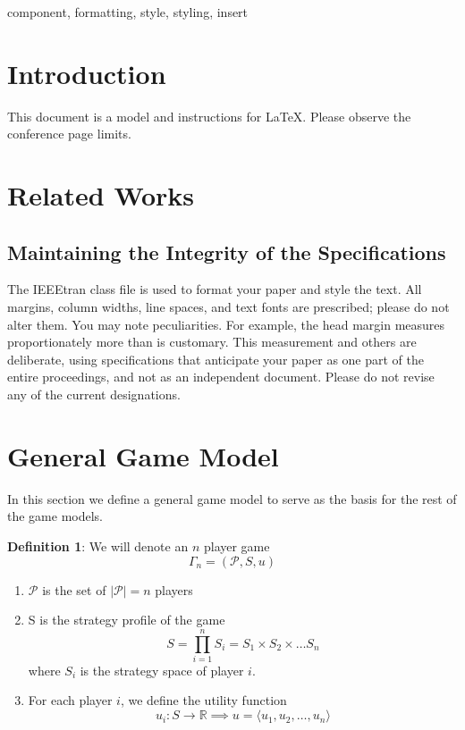 \documentclass[conference]{IEEEtran}
\begin{document}
\begin{IEEEkeywords}
component, formatting, style, styling, insert
\end{IEEEkeywords}

\section{Introduction}
This document is a model and instructions for \LaTeX.
Please observe the conference page limits. 

\section{Related Works}

\subsection{Maintaining the Integrity of the Specifications}

The IEEEtran class file is used to format your paper and style the text. All margins, 
column widths, line spaces, and text fonts are prescribed; please do not 
alter them. You may note peculiarities. For example, the head margin
measures proportionately more than is customary. This measurement 
and others are deliberate, using specifications that anticipate your paper 
as one part of the entire proceedings, and not as an independent document. 
Please do not revise any of the current designations.
\fi
\section{General Game Model}
In this section we define a general game model to serve as the basis for the rest of the game models.

\textbf{Definition 1}: We will denote an $n$ player game $$\Gamma_n = (\mathcal{P}, S, u)$$
\begin{enumerate}
\item $\mathcal{P}$ is the set of $|\mathcal{P}| = n$ players
\item S is the strategy profile of the game $$S = \displaystyle \prod_{i=1}^n S_i = S_1 \times S_2 \times \ldots S_n $$ where $S_i$ is the strategy space of player $i$.
\item For each player $i$, we define the utility function $$u_i \mathpunct{:} S \to \mathbb{R} \implies u = \langle u_1, u_2, \ldots, u_n \rangle$$

\end{enumerate}
\end{document}
